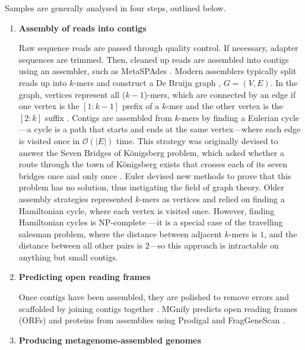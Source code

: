 Samples are generally analysed in four steps, outlined below.

\begin{enumerate}
    \renewcommand{\theenumi}{\Roman{enumi}}%
    \item \textbf{Assembly of reads into contigs}

    Raw sequence reads are passed through quality control. If necessary, adapter sequences are trimmed. Then, cleaned up reads are assembled into contigs using an assembler, such as MetaSPAdes \cite{Nurk2017}. Modern assemblers typically split reads up into $k$-mers and construct a De Bruijn graph \cite{BRUIJN1946}, $G = (V,E)$. In the graph, vertices represent all ($k-1$)-mers, which are connected by an edge if one vertex is the $[1 : k-1]$ prefix of a $k$-mer and the other vertex is the $[2:k]$ suffix \cite{Myers1995,Compeau2011}. Contigs are assembled from $k$-mers by finding a Eulerian cycle---a cycle is a path that starts and ends at the same vertex---where each edge is visited once in $\mathcal{O}(|E|)$ time. This strategy was originally devised to answer the Seven Bridges of Königsberg problem, which asked whether a route through the town of Königsberg exists that crosses each of its seven bridges once and only once \cite{Euler}. Euler devised new methods to prove that this problem has no solution, thus instigating the field of graph theory. Older assembly strategies represented $k$-mers as vertices \cite{Compeau2011} and relied on finding a Hamiltonian cycle, where each vertex is visited once. However, finding Hamiltonian cycles is NP-complete \cite{Garey1979}---it is a special case of the travelling salesman problem, where the distance between adjacent $k$-mers is $1$, and the distance between all other pairs is $2$---so this approach is intractable on anything but small contigs.

    \item \textbf{Predicting open reading frames}

    Once contigs have been assembled, they are polished to remove errors and scaffolded by joining contigs together \cite{Lantz2018}. MGnify predicts open reading frames (ORFs) and proteins from assemblies using Prodigal \cite{Hyatt2010} and FragGeneScan \cite{Ismail2014}.

    \item \textbf{Producing metagenome-assembled genomes}


\end{enumerate}
